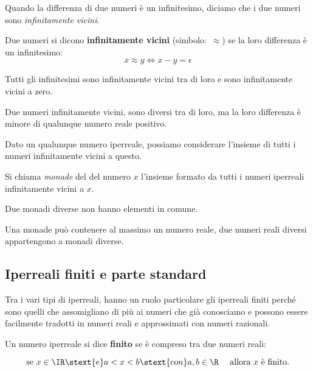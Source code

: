 Quando la differenza di due numeri è un infinitesimo, diciamo 
che i due numeri sono \emph{infinitamente vicini}.

\begin{definizione}    %
Due numeri si dicono \textbf{infinitamente vicini} (simbolo:~\(\approx\)) se 
la loro differenza è un infinitesimo:
\[x \approx y \Leftrightarrow x - y = \epsilon\]
\end{definizione}

Tutti gli infinitesimi sono infinitamente vicini tra di loro e sono 
infinitamente vicini a zero.

Due numeri infinitamente vicini, sono diversi tra di loro, ma la loro 
differenza è minore di qualunque numero reale positivo.

Dato un qualunque numero iperreale, possiamo considerare l'insieme di tutti 
i numeri infinitamente vicini a questo. 

\begin{definizione}
 Si chiama \emph{monade} del del numero \(x\) l'insieme formato da tutti i 
numeri iperreali infinitamente vicini a \(x\).
\end{definizione}

Due monadi diverse non hanno elementi in comune.

Una monade può contenere al massimo un numero reale, due numeri reali 
diversi appartengono a monadi diverse.

\subsection{Iperreali finiti e parte standard}
\label{subsec:insnum_partestandard}

Tra i vari tipi di iperreali, hanno un ruolo particolare gli iperreali 
finiti perché sono quelli che assomigliano di più ai numeri che già 
conosciamo e possono essere facilmente tradotti in numeri reali e 
approssimati con numeri razionali. 

\begin{definizione}
 Un numero iperreale si dice \textbf{finito} se è compreso tra 
due numeri reali:

\[\text{se } x \in \IR \stext{e}  a < x < b \stext{con} 
  a, b \in \R \quad \text{ allora } x \text{ è finito.}\]
\end{definizione}

